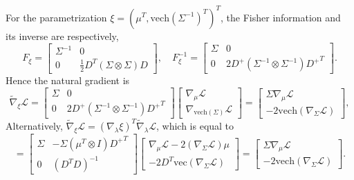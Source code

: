 \documentclass{statsoc}
\newcommand\mL{{\mathcal{L}}}
\newcommand{\vc}{\text{vec}}
\newcommand{\vech}{\text{vech}}
\begin{document}
For the parametrization $\xi = (\mu^T, \vech(\Sigma^{-1})^T)^T$, the Fisher information and its inverse are respectively,
\begin{equation*}
F_\xi = \begin{bmatrix}
\Sigma^{-1} & 0 \\
0 & \frac{1}{2}D^T (\Sigma \otimes \Sigma) D
\end{bmatrix}, 
\quad 
F_\xi^{-1} = \begin{bmatrix}
\Sigma & 0 \\
0 & 2D^+ (\Sigma^{-1} \otimes \Sigma^{-1}) {D^+}^T
\end{bmatrix}.
\end{equation*}
Hence the natural gradient is 
\begin{equation*}
\widetilde{\nabla}_\xi \mL= \begin{bmatrix}
\Sigma & 0 \\
0 & 2D^+ (\Sigma^{-1} \otimes \Sigma^{-1}) {D^+}^T
\end{bmatrix}\begin{bmatrix}
\nabla_\mu \mL \\ \nabla_{\vech(\Sigma)} \mL
\end{bmatrix} = \begin{bmatrix}
\Sigma \nabla_\mu \mL \\ - 2 \vech(\nabla_\Sigma \mL)
\end{bmatrix},
\end{equation*}
Alternatively, $\widetilde{\nabla}_\xi \mL =  (\nabla_\lambda \xi)^T \widetilde{\nabla}_\lambda \mL $, which is equal to
\begin{equation*}
= \begin{bmatrix}
\Sigma & - \Sigma (\mu^T \otimes I){D^+}^T \\
0 & (D^T D)^{-1} \end{bmatrix}
\begin{bmatrix} \nabla_\mu \mL - 2(\nabla_{\Sigma}\mL) \mu \\ -2 D^T \vc(\nabla_{\Sigma} \mL) \end{bmatrix} = \begin{bmatrix} \Sigma \nabla_\mu \mL \\ -2 \vech (\nabla_{\Sigma} \mL) \end{bmatrix}.
\end{equation*}
\end{document}
